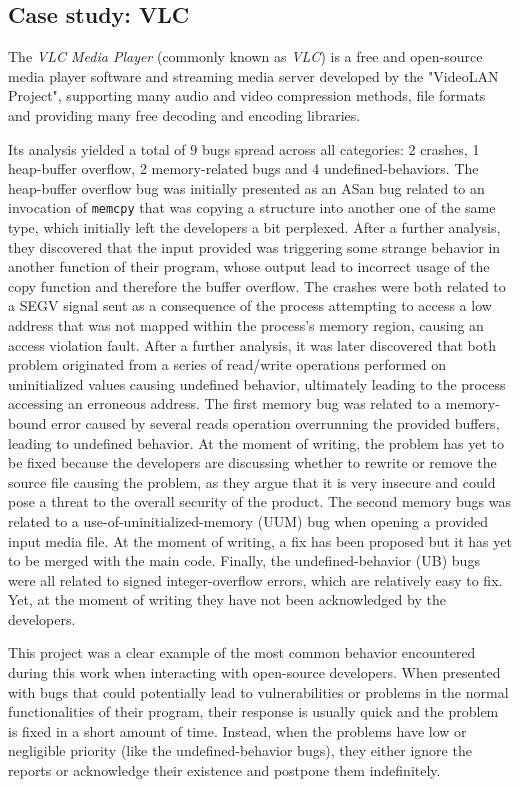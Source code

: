 \newpage
\subsection{Case study: VLC}
The \textit{VLC Media Player} (commonly known as \textit{VLC}) \cite{vlc} is a free and open-source media player software and streaming media server developed by the "VideoLAN Project", supporting many audio and video compression methods, file formats and providing many free decoding and encoding libraries.

Its analysis yielded a total of 9 bugs spread across all categories: 2 crashes, 1 heap-buffer overflow, 2 memory-related bugs and 4 undefined-behaviors.
The heap-buffer overflow bug was initially presented as an ASan bug related to an invocation of \verb|memcpy| that was copying a structure into another one of the same type, which initially left the developers a bit perplexed. After a further analysis, they discovered that the input provided was triggering some strange behavior in another function of their program, whose output lead to incorrect usage of the copy function and therefore the buffer overflow.
The crashes were both related to a SEGV signal sent as a consequence of the process attempting to access a low address that was not mapped within the process's memory region, causing an access violation fault. After a further analysis, it was later discovered that both problem originated from a series of read/write operations performed on uninitialized values causing undefined behavior, ultimately leading to the process accessing an erroneous address.
The first memory bug was related to a memory-bound error caused by several reads operation overrunning the provided buffers, leading to undefined behavior. At the moment of writing, the problem has yet to be fixed because the developers are discussing whether to rewrite or remove the source file causing the problem, as they argue that it is very insecure and could pose a threat to the overall security of the product.
The second memory bugs was related to a use-of-uninitialized-memory (UUM) bug when opening a provided input media file. At the moment of writing, a fix has been proposed but it has yet to be merged with the main code.
Finally, the undefined-behavior (UB) bugs were all related to signed integer-overflow errors, which are relatively easy to fix. Yet, at the moment of writing they have not been acknowledged by the developers.

This project was a clear example of the most common behavior encountered during this work when interacting with open-source developers.
When presented with bugs that could potentially lead to vulnerabilities or problems in the normal functionalities of their program, their response is usually quick and the problem is fixed in a short amount of time. 
Instead, when the problems have low or negligible priority (like the undefined-behavior bugs), they either ignore the reports or acknowledge their existence and postpone them indefinitely.



